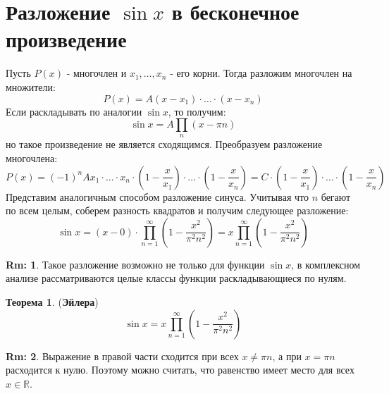 \documentclass[12pt]{article}
\newcommand{\MR}{\mathbb{R}}
\theoremstyle{definition}
\newtheorem{rem}{Rm:}
\newtheorem{theorem}{Теорема}
\begin{document}
\section*{Разложение $\sin x$ в бесконечное произведение}
Пусть $P(x)$ - многочлен и $x_1, \dotsc, x_n$ - его корни. Тогда разложим многочлен на множители:
$$
	P(x) = A(x - x_1){\cdot} \dotsc {\cdot} (x - x_n)
$$
Если раскладывать по аналогии $\sin x$, то получим:
$$
	\sin x = A \prod\limits_n (x - \pi n)
$$
но такое произведение не является сходящимся. Преобразуем разложение многочлена:
$$
	P(x) = (-1)^nAx_1 {\cdot}\dotsc {\cdot}x_n {\cdot} \left(1 - \dfrac{x}{x_1}\right){\cdot}\dotsc{\cdot}\left(1 - \dfrac{x}{x_n}\right) = C{\cdot}\left(1 - \dfrac{x}{x_1}\right){\cdot}\dotsc{\cdot}\left(1 - \dfrac{x}{x_n}\right)
$$
Представим аналогичным способом разложение синуса. Учитывая что $n$ бегают по всем целым, соберем разность квадратов и получим следующее разложение:
$$
	\sin x = (x-0){\cdot} \prod\limits_{n = 1}^{\infty}\left(1 - \dfrac{x^2}{\pi^2 n^2}\right) = x \prod\limits_{n = 1}^{\infty}\left(1 - \dfrac{x^2}{\pi^2 n^2}\right)
$$
\begin{rem}
	Такое разложение возможно не только для функции $\sin{x}$, в комплексном анализе рассматриваются целые классы функции раскладывающиеся по нулям.
\end{rem}
\begin{theorem}(\textbf{Эйлера})
	$$
		\sin x = x \prod\limits_{n = 1}^{\infty}\left(1 - \dfrac{x^2}{\pi^2 n^2}\right)
	$$
\end{theorem}
\begin{rem}
	Выражение в правой части сходится при всех $x \neq \pi n$, а при $x = \pi n$ расходится к нулю. Поэтому можно считать, что равенство имеет место для всех $x \in \MR$.
\end{rem}
\end{document}

